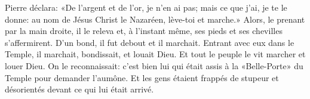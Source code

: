 Pierre déclara: «De l’argent et de l’or, je n’en ai pas;
	mais ce que j’ai, je te le donne:
	au nom de Jésus Christ le Nazaréen, lève-toi et marche.»
Alors, le prenant par la main droite, il le releva
	et, à l’instant même, ses pieds et ses chevilles s’affermirent.
	D’un bond, il fut debout et il marchait.
Entrant avec eux dans le Temple, il marchait, bondissait, et louait Dieu.
	Et tout le peuple le vit marcher et louer Dieu.
On le reconnaissait:
	c’est bien lui qui était assis à la «Belle-Porte» du Temple
		pour demander l’aumône.
Et les gens étaient frappés de stupeur et désorientés
	devant ce qui lui était arrivé.
